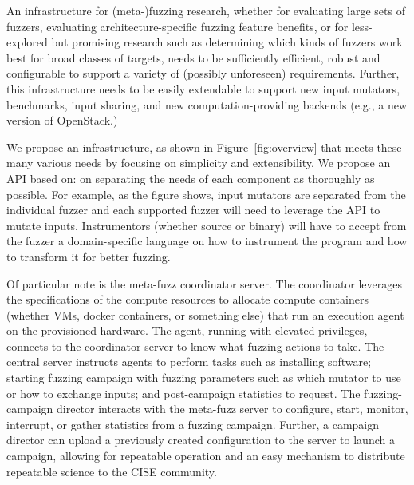 


An infrastructure for (meta-)fuzzing research, 
whether for evaluating large sets of fuzzers, 
evaluating architecture-specific fuzzing feature benefits, 
or for less-explored but promising research such as determining which kinds of 
fuzzers work best for broad classes of targets, needs to be sufficiently 
efficient, robust and configurable to support a variety of (possibly 
unforeseen) requirements.  
Further, this infrastructure needs to be easily extendable to support new input 
mutators, benchmarks, input sharing, and new computation-providing backends 
(e.g., a new version of OpenStack.)

We propose an infrastructure, as shown in Figure~\ref{fig:overview} 
that meets these many various needs by focusing on 
simplicity and extensibility.  We propose an API based on:
on separating the needs of each component as thoroughly as possible.
For example, as the figure shows, input mutators are separated from the
individual fuzzer and each supported fuzzer will need to leverage the API to
mutate inputs.  Instrumentors (whether source or binary) will have to accept 
from the fuzzer a domain-specific language on how to instrument the program
and how to transform it for better fuzzing.  

Of particular note is the meta-fuzz coordinator server.
The coordinator leverages the specifications
of the compute resources to allocate compute containers (whether VMs, 
docker containers, or something else) that run an execution agent 
on the provisioned hardware.   The agent, running with elevated privileges, 
connects to the coordinator server to know what fuzzing actions to take.
The central server instructs agents to perform tasks such as 
installing software; starting fuzzing campaign with fuzzing parameters such as 
which mutator to use or how to exchange inputs; and post-campaign statistics to request.
The fuzzing-campaign director interacts with the meta-fuzz server to configure, start, 
monitor, interrupt, or gather statistics from a fuzzing campaign.  Further, a 
campaign director can upload a previously created configuration to the server 
to launch a campaign, allowing for repeatable operation and an easy mechanism to distribute
repeatable science to the CISE community.  

